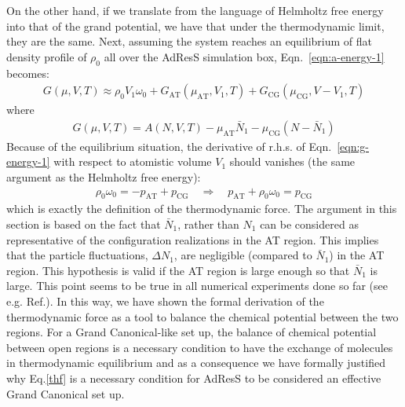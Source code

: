 \documentclass[aip,jcp,a4paper,reprint,onecolumn]{revtex4-1}
\newcommand{\AT}{{\textrm{{AT}}}}
\newcommand{\CG}{{\textrm{CG}}}
\begin{document}
\noindent
On the other hand, if we translate from the language of Helmholtz free
energy into that of the grand potential, we have that
under the thermodynamic limit, they are the same.
Next, assuming the system reaches an
equilibrium of flat density profile of $\rho_0$ all over the AdResS simulation box, 
Eqn.~\eqref{eqn:a-energy-1} becomes:
\begin{align}\label{eqn:g-energy-1}
  G(\mu, V, T) \approx
  \rho_0V_1\omega_0
  + G_{\AT}(\mu_{\AT}, V_1, T) + G_{\CG}(\mu_{\CG}, V - V_1, T)
\end{align}
where
\begin{align}
  G(\mu, V, T) = A(N, V, T) - \mu_{\AT} \bar N_1 - \mu_{\CG}(N - \bar N_1)
\end{align}
Because of the equilibrium situation, the derivative of r.h.s. of
Eqn.~\eqref{eqn:g-energy-1} with respect to atomistic volume $V_1$
should vanishes (the same argument as the Helmholtz free energy):
\begin{align}
  \rho_0\omega_0 = -p_{\AT}+p_{\CG} \quad\Longrightarrow\quad
  p_{\AT} + \rho_0\omega_0 = p_{\CG}
\end{align}
which is exactly the definition of the thermodynamic force.
The argument in this section is based on the fact that $\bar N_{1}$, rather than $N_{1}$ can be considered as representative of the configuration realizations in the AT region. This implies that the particle fluctuations, $\Delta N_{1}$,
are negligible (compared to $\bar N_{1}$) in the AT region. This hypothesis is valid if the AT region is large enough so that $\bar N_{1}$ is large. This point seems to be true in all numerical experiments done so far (see e.g. Ref.\cite{debash}). In this way, we have shown the formal derivation of the thermodynamic force as a tool to balance the chemical potential between the two regions. For a Grand Canonical-like set up, the balance of chemical potential between open regions is a necessary condition to have the exchange of molecules in thermodynamic equilibrium and as a consequence we have formally justified why Eq.\ref{thf} is a necessary condition for AdResS to be considered an effective Grand Canonical set up.
\end{document}
